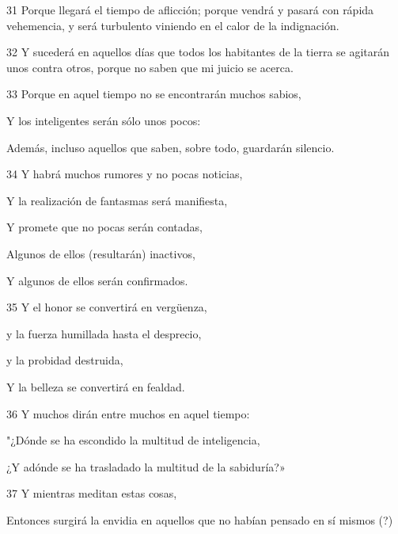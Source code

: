 \par 31 Porque llegará el tiempo de aflicción; porque vendrá y pasará con rápida vehemencia, y será turbulento viniendo en el calor de la indignación.

\par 32 Y sucederá en aquellos días que todos los habitantes de la tierra se agitarán unos contra otros, porque no saben que mi juicio se acerca.

\par 33 Porque en aquel tiempo no se encontrarán muchos sabios,

\par Y los inteligentes serán sólo unos pocos:

\par Además, incluso aquellos que saben, sobre todo, guardarán silencio.

\par 34 Y habrá muchos rumores y no pocas noticias,

\par Y la realización de fantasmas será manifiesta,

\par Y promete que no pocas serán contadas,

\par Algunos de ellos (resultarán) inactivos,

\par Y algunos de ellos serán confirmados.

\par 35 Y el honor se convertirá en vergüenza,

\par y la fuerza humillada hasta el desprecio,

\par y la probidad destruida,

\par Y la belleza se convertirá en fealdad.

\par 36 Y muchos dirán entre muchos en aquel tiempo:

\par "¿Dónde se ha escondido la multitud de inteligencia,

\par ¿Y adónde se ha trasladado la multitud de la sabiduría?»

\par 37 Y mientras meditan estas cosas,

\par Entonces surgirá la envidia en aquellos que no habían pensado en sí mismos (?)

